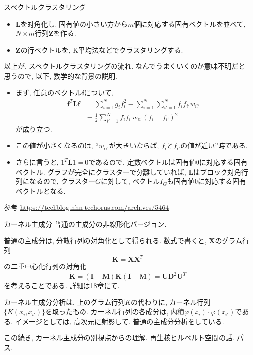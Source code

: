 \documentclass[dvipdfmx,8pt]{beamer}
\begin{document}
  \begin{frame}{スペクトルクラスタリング}
    \begin{itemize}
      \item $\textbf{L}$を対角化し, 固有値の小さい方から$m$個に対応する固有ベクトルを並べて,
        $N\times m$行列$\textbf{Z}$を作る.
      \item $\textbf{Z}$の行ベクトルを, K平均法などでクラスタリングする.
    \end{itemize}
    以上が, スペクトルクラスタリングの流れ. なんでうまくいくのか意味不明だと思うので, 以下, 数学的な背景の説明.
    \begin{itemize}
      \item まず, 任意のベクトル$\textbf{f}$について,
        \begin{eqnarray*}
          \textbf{f}^T\textbf{L}\textbf{f}&=\sum_{i=1}^Ng_if_i^2-\sum_{i=1}^N\sum_{i'=1}^Nf_if_{i'}w_{ii'}\\
          &=\frac{1}{2}\sum_{i'=1}^Nf_if_{i'}w_{ii'}(f_i-f_{i'})^2
        \end{eqnarray*}
        が成り立つ.
      \item この値が小さくなるのは, ``$w_{ii'}$が大きいならば, $f_i$と$f_{i'}$の値が近い''時である.
      \item さらに言うと, $1^T\textbf{L}1=0$であるので, 定数ベクトルは固有値$0$に対応する固有ベクトル.
        グラフが完全にクラスターで分離していれば, $\textbf{L}$はブロック対角行列になるので,
        クラスター$G$に対して, ベクトル$I_G$も固有値0に対応する固有ベクトルとなる.
    \end{itemize}

    参考
    \url{https://techblog.nhn-techorus.com/archives/5464}
  \end{frame}
  \begin{frame}{カーネル主成分}
    普通の主成分の非線形化バージョン.

    普通の主成分は, 分散行列の対角化として得られる.
    数式で書くと, $\textbf{X}$のグラム行列
    \[
      \textbf{K}=\textbf{X}\textbf{X}^T
    \]
    の二重中心化行列の対角化
    \[
      \tilde{\textbf{K}}=(\textbf{I}-\textbf{M})\textbf{K}(\textbf{I}-\textbf{M})=\textbf{U}\textbf{D}^2\textbf{U}^T
    \]
    を考えることである. 詳細は18章にて.

    カーネル主成分分析は, 上のグラム行列$K$の代わりに,
    カーネル行列$\{K(x_i,x_{i'})\}$を取ったもの.
    カーネル行列の各成分は, 内積$\varphi(x_i)\cdot\varphi(x_{i'})$である.
    イメージとしては, 高次元に射影して, 普通の主成分分析をしている.

    この続き, カーネル主成分の別視点からの理解.
    再生核ヒルベルト空間の話. パス.
  \end{frame}
\end{document}
